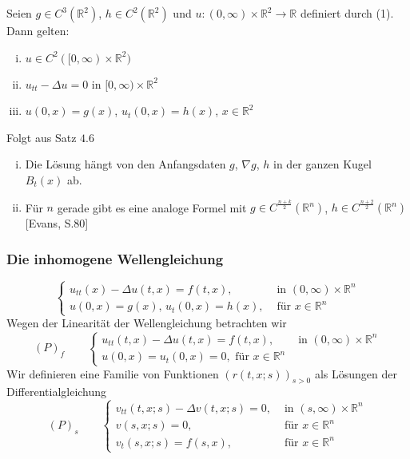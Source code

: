 \begin{satz}
	Seien $ g \in C^3(\mathbb{R}^2)$, $h \in C^2(\mathbb{R}^2)$ und $u: (0,\infty) \times \mathbb{R}^2 \to \mathbb{R}$ definiert durch (1). Dann gelten:
	\begin{enumerate}[(i)]
		\item $u \in C^2([0,\infty) \times \mathbb{R}^2)$
		\item $u_{tt} - \Delta u = 0$ in $[0,\infty) \times \mathbb{R}^2$
		\item $u(0,x)=g(x)$, $u_t(0,x) = h(x)$, $x \in \mathbb{R}^2$
	\end{enumerate} 
\end{satz}
\begin{beweis}
	Folgt aus Satz $4.6$
\end{beweis}
\begin{bemerkung}
	\begin{enumerate}[(i)]
		\item Die Lösung hängt von den Anfangsdaten $g$, $ \nabla g$, $h$ in der ganzen Kugel $B_t(x)$ ab.
		\item Für $n$ gerade gibt es eine analoge Formel mit $g \in C^{\frac{n+k}{2}}(\mathbb{R}^n)$, $h \in C^{\frac{n+2}{2}}(\mathbb{R}^n)$ [Evans, S.80]
	\end{enumerate}
\end{bemerkung}
\subsubsection{Die inhomogene Wellengleichung} 
\label{ssub:die_inhomogene_wellengleichung}

\[
	\begin{cases}
		u_{tt}(x)- \Delta u(t,x) = f(t,x), &\text{ in }(0,\infty) \times \mathbb{R}^n\\
		u(0,x) = g(x), \, u_t(0,x) = h(x), &\text{ für }x \in \mathbb{R}^n
	\end{cases}
\]
Wegen der Linearität der Wellengleichung betrachten wir
\[
	(P)_f \qquad \begin{cases}
		u_{tt}(t,x) - \Delta u(t,x) = f(t,x), &\text{ in }(0,\infty) \times \mathbb{R}^n\\
		u(0,x) = u_t(0,x) = 0, \text{ für } x \in \mathbb{R}^n
	\end{cases}
\]
Wir definieren eine Familie von Funktionen $(r(t,x;s))_{s >0}$ als Lösungen der Differentialgleichung
\[
	(P)_s \qquad \begin{cases}
		v_{tt}(t,x;s)- \Delta v(t,x;s) = 0, &\text{ in }(s, \infty) \times \mathbb{R}^n\\ 
		v(s,x;s) = 0 ,&\text{ für } x \in \mathbb{R}^n \\
		v_t(s,x;s) = f(s,x) ,&\text{ für } x \in \mathbb{R}^n
	\end{cases}
\]

